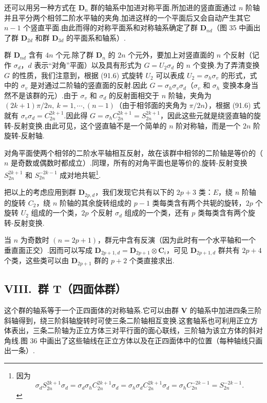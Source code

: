 还可以用另一种方式在 $\boldsymbol{D}_n$ 群的轴系中加进对称平面.所加进的竖直面通过 $n$ 阶轴并且平分两个相邻二阶水平轴的夹角.加进这样的一个平面后又会自动产生其它 $n-1$ 个竖直平面.由此而得的对称平面系和对称轴系确定了群 $\boldsymbol{D}_{nd}$（图 35 中画出了群 $\boldsymbol{D}_{2d}$ 和群 $\boldsymbol{D}_{3d}$ 的平面系和轴系）.

群 $\boldsymbol{D}_{nd}$ 含有 $4n$ 个元.除了群 $\boldsymbol{D}_n$ 的 $2n$ 个元外，要加上对竖直面的 $n$ 个反射（记作 $\sigma_d$，$d$ 表示“对角”平面）以及具有形式为 $G=U_2\sigma_d$ 的 $n$ 个变换.为了弄清变换 $G$ 的性质，我们注意到，根据 (91.6) 式旋转 $U_2$ 可以表成 $U_2=\sigma_h\sigma_v$ 的形式，式中的 $\sigma_v$ 是对通过二阶轴的竖直面的反射.因此 $G=\sigma_h\sigma_v\sigma_d$（$\sigma_v$ 和 $\sigma_h$ 变换本身当然不是该群的元）.由于 $\sigma_v$ 和 $\sigma_d$ 的反射面相交于 $n$ 阶轴，夹角为 $(2k+1)\pi/2n,\ k=1,\cdots,(n-1)$（由于相邻面的夹角为 $\pi/2n$），根据 (91.6) 式就有 $\sigma_v\sigma_d=C_{2n}^{2k+1}$.因此得 $G=\sigma_hC_{2n}^{2k+1}=S_{2n}^{2k+1}$，因此这些元就是绕竖直轴的旋转-反射变换.由此可见，这个竖直轴不是一个简单的 $n$ 阶对称轴，而是一个 $2n$ 阶旋转-反射轴.

对角平面使两个相邻的二阶水平轴相互反射，故在该群中相邻的二阶轴是等价的（$n$ 是奇数或偶数时都成立）.同理，所有的对角平面也是等价的.旋转-反射变换 $S_{2n}^{2k+1}$ 和 $S_{2n}^{-2k-1}$ 成对地共轭\footnote{因为
\begin{equation*}
  \sigma_d S_{2n}^{2k+1}\sigma_d=\sigma_d\sigma_h C_{2n}^{2k+1}\sigma_d=\sigma_h\sigma_d C_{2n}^{2k+1}\sigma_d=\sigma_h C_{2n}^{-2k-1}=S_{2n}^{-2k-1}.
\end{equation*}}.

把以上的考虑应用到群 $\boldsymbol{D}_{2p,d}$，我们发现它共有以下的 $2p+3$ 类：$E$，绕 $n$ 阶轴的旋转 $C_2$，绕 $n$ 阶轴的其余旋转组成的 $p-1$ 类每类含有两个共轭的旋转，$2p$ 个旋转 $U_2$ 组成的一个类，$2p$ 个反射 $\sigma_d$ 组成的一个类，还有 $p$ 类每类含有两个旋转-反射变换.

当 $n$ 为奇数时 $(n=2p+1)$，群元中含有反演（因为此时有一个水平轴和一个垂直面正交）.因而可以写成 $\boldsymbol{D}_{2p+1,d}=\boldsymbol{D}_{2p+1}\otimes\boldsymbol{C}_i$，可见 $\boldsymbol{D}_{2p+1,d}$ 群共有 $2p+4$ 个类，这些类可以由 $\boldsymbol{D}_{2p+1}$ 群的 $p+2$ 个类直接求出.

\subsection*{VIII.\ 群 $\boldsymbol{T}$（四面体群）}

这个群的轴系等于一个正四面体的对称轴系.它可以由群 $\boldsymbol{V}$ 的轴系中加进四条三阶斜轴得到，绕三阶斜轴旋转时可使三条二阶轴相互变换.这套轴系也可利用正立方体表出，三条二阶轴为正立方体三对平行面的面心联线，三阶轴为该立方体的斜对角线.图 36 中画出了这些轴线在正立方体以及在正四面体中的位置（每种轴线只画出一条）.

